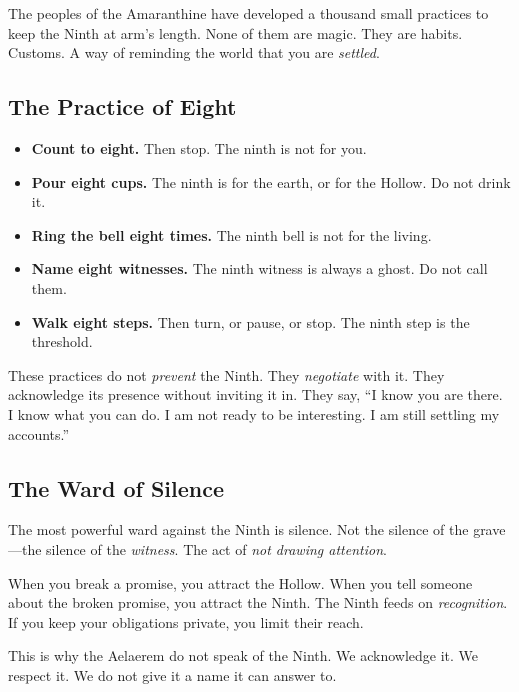 \documentclass[11pt]{book}
\begin{document}
The peoples of the Amaranthine have developed a thousand small practices to keep the Ninth at arm's length. None of them are magic. They are habits. Customs. A way of reminding the world that you are \textit{settled}.

\subsection{The Practice of Eight}

\begin{tcolorbox}[colback=gray!5!white, colframe=wardgray!75!black, title=Observances of the Eight,breakable]
\begin{itemize}
  \item \textbf{Count to eight.} Then stop. The ninth is not for you.
  \item \textbf{Pour eight cups.} The ninth is for the earth, or for the Hollow. Do not drink it.
  \item \textbf{Ring the bell eight times.} The ninth bell is not for the living.
  \item \textbf{Name eight witnesses.} The ninth witness is always a ghost. Do not call them.
  \item \textbf{Walk eight steps.} Then turn, or pause, or stop. The ninth step is the threshold.
\end{itemize}
\end{tcolorbox}

These practices do not \textit{prevent} the Ninth. They \textit{negotiate} with it. They acknowledge its presence without inviting it in. They say, ``I know you are there. I know what you can do. I am not ready to be interesting. I am still settling my accounts.''

\subsection{The Ward of Silence}

The most powerful ward against the Ninth is silence. Not the silence of the grave---the silence of the \textit{witness}. The act of \textit{not drawing attention}.

When you break a promise, you attract the Hollow. When you tell someone about the broken promise, you attract the Ninth. The Ninth feeds on \textit{recognition}. If you keep your obligations private, you limit their reach.

This is why the Aelaerem do not speak of the Ninth. We acknowledge it. We respect it. We do not give it a name it can answer to.
\end{document}
